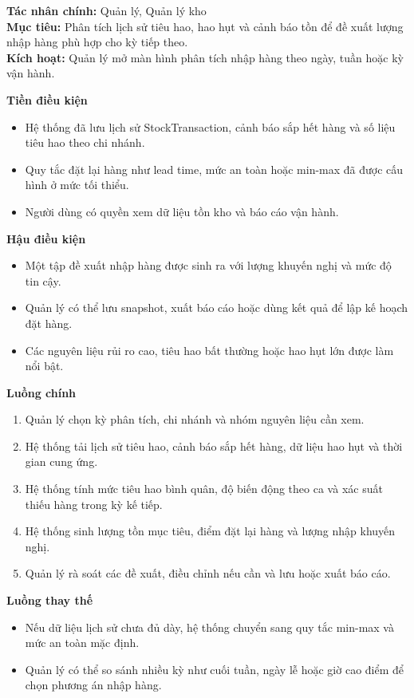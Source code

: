 \documentclass[11pt,a4paper]{article}
\begin{document}
    \begin{usecasebox}[title={UC-INV-03 --- Phân tích tiêu hao và đề xuất nhập hàng}]
    \textbf{Tác nhân chính:} Quản lý, Quản lý kho\\
    \textbf{Mục tiêu:} Phân tích lịch sử tiêu hao, hao hụt và cảnh báo tồn để đề xuất lượng nhập hàng phù hợp cho kỳ tiếp theo.\\
    \textbf{Kích hoạt:} Quản lý mở màn hình phân tích nhập hàng theo ngày, tuần hoặc kỳ vận hành.

    \medskip
    \textbf{Tiền điều kiện}
    \begin{itemize}[leftmargin=1.8em]
  \item Hệ thống đã lưu lịch sử \textsf{StockTransaction}, cảnh báo sắp hết hàng và số liệu tiêu hao theo chi nhánh.
  \item Quy tắc đặt lại hàng như lead time, mức an toàn hoặc min-max đã được cấu hình ở mức tối thiểu.
  \item Người dùng có quyền xem dữ liệu tồn kho và báo cáo vận hành.
\end{itemize}

    \textbf{Hậu điều kiện}
    \begin{itemize}[leftmargin=1.8em]
  \item Một tập đề xuất nhập hàng được sinh ra với lượng khuyến nghị và mức độ tin cậy.
  \item Quản lý có thể lưu snapshot, xuất báo cáo hoặc dùng kết quả để lập kế hoạch đặt hàng.
  \item Các nguyên liệu rủi ro cao, tiêu hao bất thường hoặc hao hụt lớn được làm nổi bật.
\end{itemize}

    \textbf{Luồng chính}
    \begin{enumerate}[leftmargin=1.8em]
  \item Quản lý chọn kỳ phân tích, chi nhánh và nhóm nguyên liệu cần xem.
  \item Hệ thống tải lịch sử tiêu hao, cảnh báo sắp hết hàng, dữ liệu hao hụt và thời gian cung ứng.
  \item Hệ thống tính mức tiêu hao bình quân, độ biến động theo ca và xác suất thiếu hàng trong kỳ kế tiếp.
  \item Hệ thống sinh lượng tồn mục tiêu, điểm đặt lại hàng và lượng nhập khuyến nghị.
  \item Quản lý rà soát các đề xuất, điều chỉnh nếu cần và lưu hoặc xuất báo cáo.
\end{enumerate}

    \textbf{Luồng thay thế}
    \begin{itemize}[leftmargin=1.8em]
  \item Nếu dữ liệu lịch sử chưa đủ dày, hệ thống chuyển sang quy tắc min-max và mức an toàn mặc định.
  \item Quản lý có thể so sánh nhiều kỳ như cuối tuần, ngày lễ hoặc giờ cao điểm để chọn phương án nhập hàng.
\end{itemize}


\end{usecasebox}
\end{document}
